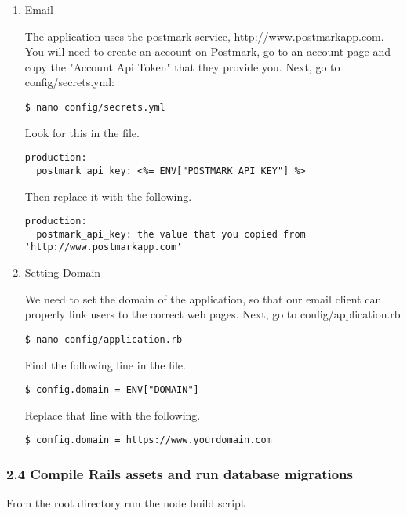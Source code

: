 \documentclass[11pt]{article}
\begin{document}
\begin{enumerate}
\item Email
\label{sec:orgebc1d37}

The application uses the postmark service, \url{http://www.postmarkapp.com}. You will need to create an account on Postmark, go to an account page and copy the "Account Api Token" that they provide you.
Next, go to config/secrets.yml:

\begin{verbatim}
$ nano config/secrets.yml
\end{verbatim}

Look for this in the file.

\begin{verbatim}
production:
  postmark_api_key: <%= ENV["POSTMARK_API_KEY"] %>
\end{verbatim}

Then replace it with the following.

\begin{verbatim}
production:
  postmark_api_key: the value that you copied from 'http://www.postmarkapp.com'
\end{verbatim}


\item Setting Domain
\label{sec:orge6fc551}

We need to set the domain of the application, so that our email client can properly link users to the correct web pages.
Next, go to config/application.rb
\begin{verbatim}
$ nano config/application.rb
\end{verbatim}

Find the following line in the file.

\begin{verbatim}
$ config.domain = ENV["DOMAIN"]
\end{verbatim}

Replace that line with the following.

\begin{verbatim}
$ config.domain = https://www.yourdomain.com
\end{verbatim}
\end{enumerate}

\subsubsection{2.4 Compile Rails assets and run database migrations}
\label{sec:orgafbcc4d}

From the root directory run the node build script
\end{document}
